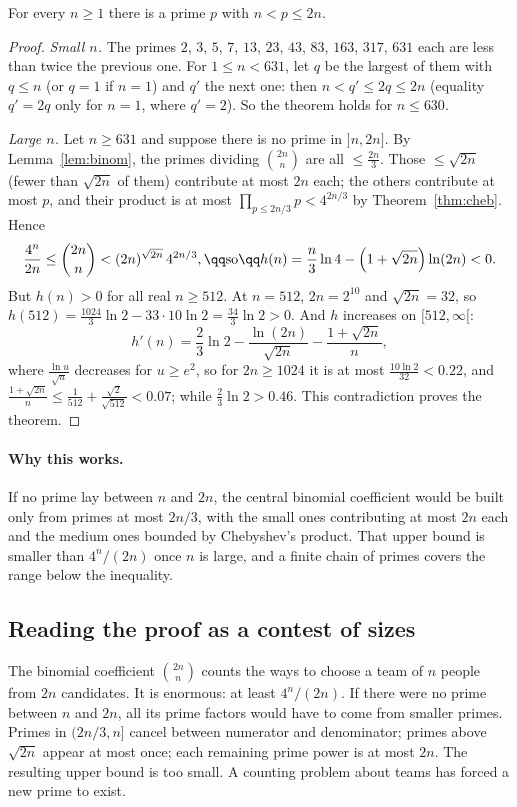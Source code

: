 \begin{theorem}\label{thm:bertrand}
For every $n\ge1$ there is a prime $p$ with $n<p\le2n$.
\end{theorem}
\begin{proof}
\emph{Small $n$.} The primes $2$, $3$, $5$, $7$, $13$, $23$, $43$, $83$, $163$, $317$, $631$ each are less than twice the previous one. For $1\le n<631$, let $q$ be the largest of them with $q\le n$ (or $q=1$ if $n=1$) and $q'$ the next one: then $n<q'\le2q\le2n$ (equality $q'=2q$ only for $n=1$, where $q'=2$). So the theorem holds for $n\le630$.

\emph{Large $n$.} Let $n\ge631$ and suppose there is no prime in $]n,2n]$. By Lemma~\ref{lem:binom}, the primes dividing $\binom{2n}n$ are all $\le\frac{2n}3$. Those $\le\sqrt{2n}$ (fewer than $\sqrt{2n}$ of them) contribute at most $2n$ each; the others contribute at most $p$, and their product is at most $\prod_{p\le2n/3}p<4^{2n/3}$ by Theorem~\ref{thm:cheb}. Hence
\[
\begin{gathered}\frac{4^n}{2n}\le\binom{2n}n<(2n)^{\sqrt{2n}}\,4^{2n/3},\qq\text{so}\qq h(n)=\frac n3\ln4-\left(1+\sqrt{2n}\right)\ln(2n)<0.\end{gathered}
\]
But $h(n)>0$ for all real $n\ge512$. At $n=512$, $2n=2^{10}$ and $\sqrt{2n}=32$, so $h(512)=\frac{1024}3\ln2-33\cdot10\ln2=\frac{34}3\ln2>0$. And $h$ increases on $[512,\infty[$:
\[
h'(n)=\frac23\ln2-\frac{\ln(2n)}{\sqrt{2n}}-\frac{1+\sqrt{2n}}n,
\]
where $\frac{\ln u}{\sqrt u}$ decreases for $u\ge e^2$, so for $2n\ge1024$ it is at most $\frac{10\ln2}{32}<0.22$, and $\frac{1+\sqrt{2n}}n\le\frac1{512}+\frac{\sqrt2}{\sqrt{512}}<0.07$; while $\frac23\ln2>0.46$. This contradiction proves the theorem.
\end{proof}

\paragraph{Why this works.}
If no prime lay between $n$ and $2n$, the central binomial coefficient would be built only from primes at most $2n/3$, with the small ones contributing at most $2n$ each and the medium ones bounded by Chebyshev's product. That upper bound is smaller than $4^n/(2n)$ once $n$ is large, and a finite chain of primes covers the range below the inequality.

\subsection*{Reading the proof as a contest of sizes}
The binomial coefficient $\binom{2n}n$ counts the ways to choose a team of $n$ people from $2n$ candidates. It is enormous: at least $4^n/(2n)$. If there were no prime between $n$ and $2n$, all its prime factors would have to come from smaller primes. Primes in $(2n/3,n]$ cancel between numerator and denominator; primes above $\sqrt{2n}$ appear at most once; each remaining prime power is at most $2n$. The resulting upper bound is too small. A counting problem about teams has forced a new prime to exist.


